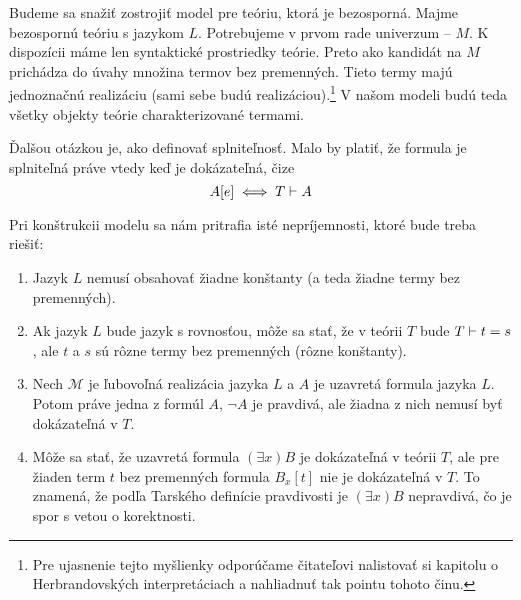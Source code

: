 \begin{dokaz}
    Budeme sa snažiť zostrojiť model pre teóriu, ktorá je bezosporná.
    Majme bezospornú teóriu s jazykom $L$.
    Potrebujeme v prvom rade univerzum -- $M$.
    K dispozícii máme len syntaktické prostriedky teórie.
    Preto ako kandidát na $M$ prichádza do úvahy
    množina termov bez premenných.
    Tieto termy majú jednoznačnú realizáciu (sami sebe budú
    realizáciou).\footnote{
        Pre ujasnenie tejto myšlienky odporúčame čitateľovi
        nalistovať si kapitolu o Herbrandovských interpretáciach
        a nahliadnuť tak pointu tohoto činu.
    }
    V našom modeli budú teda všetky objekty teórie charakterizované termami.

    Ďalšou otázkou je, ako definovať splniteľnosť. Malo by platiť, že
    formula je splniteľná práve vtedy keď je dokázateľná, čize
    \begin{equation*}
    A[e] \iff T \vdash A
    \end{equation*}

    Pri konštrukcii modelu sa nám pritrafia isté nepríjemnosti, ktoré bude 
    treba riešiť:
    \begin{enumerate}
    \item \label{en:model_problem_konst}
        Jazyk $L$ nemusí obsahovať žiadne konštanty (a teda žiadne termy bez
        premenných).

    \item \label{en:model_problem_rovnost}
        Ak jazyk $L$ bude jazyk s rovnosťou, môže sa stať, že v teórii $T$
        bude $T \vdash t=s$, ale $t$ a $s$ sú rôzne termy bez
        premenných (rôzne konštanty).

    \item \label{en:model_problem_neg}
        Nech $\mathcal{M}$ je ľubovoľná realizácia jazyka $L$ a $A$ je uzavretá
        formula jazyka $L$. Potom práve jedna z formúl $A$, $\neg A$ je
        pravdivá, ale žiadna z nich nemusí byť dokázateľná v $T$.

    \item \label{en:model_problem_korektnost}
        Môže sa stať, že uzavretá formula $(\exists x)B$ je dokázateľná v teórii
        $T$, ale pre žiaden term $t$ bez premenných formula $B_x[t]$ nie
        je dokázateľná v $T$. To znamená, že
        podľa Tarského definície pravdivosti je $(\exists x)B$
        nepravdivá, čo je spor s vetou o korektnosti.
    \end{enumerate}


\end{dokaz}

